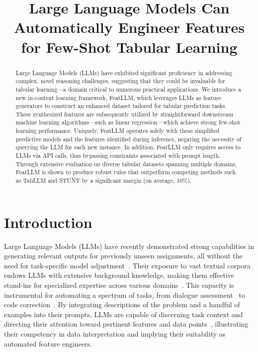 \title{Large Language Models Can Automatically Engineer Features for Few-Shot Tabular Learning}

\begin{abstract}
Large Language Models (LLMs) have exhibited significant proficiency in addressing complex, novel reasoning challenges, suggesting that they could be invaluable for tabular learning—a domain critical to numerous practical applications. We introduce a new in-context learning framework, \textsf{FeatLLM}, which leverages LLMs as feature generators to construct an enhanced dataset tailored for tabular prediction tasks. These synthesized features are subsequently utilized by straightforward downstream machine learning algorithms—such as linear regression—which achieve strong few-shot learning performance. Uniquely, \textsf{FeatLLM} operates solely with these simplified predictive models and the features identified during inference, negating the necessity of querying the LLM for each new instance. In addition, \textsf{FeatLLM} only requires access to LLMs via API calls, thus bypassing constraints associated with prompt length. Through extensive evaluation on diverse tabular datasets spanning multiple domains, \textsf{FeatLLM} is shown to produce robust rules that outperform competing methods such as TabLLM and STUNT by a significant margin (on average, 10\%).
\end{abstract}

\section{Introduction}
Large Language Models (LLMs) have recently demonstrated strong capabilities in generating relevant outputs for previously unseen assignments, all without the need for task-specific model adjustment~\cite{creswell2022selection,imani2023mathprompter,taylor2022galactica}. Their exposure to vast textual corpora endows LLMs with extensive background knowledge, making them effective stand-ins for specialized expertise across various domains~\cite{Genomes2021,singhal2023large,wilcox2003role}. This capacity is instrumental for automating a spectrum of tasks, from dialogue assessment~\cite{finch2023leveraging} to code correction~\cite{fan2023automated}. By integrating descriptions of the problem and a handful of examples into their prompts, LLMs are capable of discerning task context and directing their attention toward pertinent features and data points~\cite{brown2020language,zhao2023survey}, illustrating their competency in data interpretation and implying their suitability as automated feature engineers.


